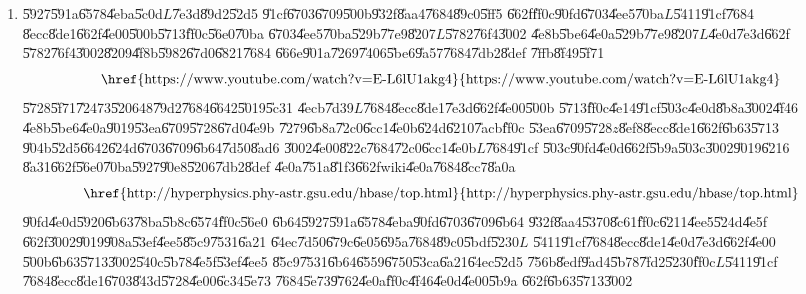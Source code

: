 \begin{enumerate}
\item \U{5927}\U{591a}\U{6578}\U{4eba}\U{5c0d}$L$\U{7e3d}\U{89d2}\U{52d5}%
\U{91cf}\U{6703}\U{6709}\U{500b}\U{932f}\U{8aa4}\U{7684}\U{89c0}\U{5ff5}%
\U{662f}\U{ff0c}\U{90fd}\U{6703}\U{4ee5}\U{70ba}$L$\U{5411}\U{91cf}\U{7684}%
\U{8ecc}\U{8de1}\U{662f}\U{4e00}\U{500b}\U{5713}\U{ff0c}\U{56e0}\U{70ba}%
\U{6703}\U{4ee5}\U{70ba}\U{529b}\U{77e9}\U{8207}$L$\U{5782}\U{76f4}\U{3002}%
\U{4e8b}\U{5be6}\U{4e0a}\U{529b}\U{77e9}\U{8207}$L$\U{4e0d}\U{7e3d}\U{662f}%
\U{5782}\U{76f4}\U{3002}\U{8209}\U{4f8b}\U{5982}\U{67d0}\U{6821}\U{7684}%
\U{666e}\U{901a}\U{7269}\U{7406}\U{5be6}\U{9a57}\U{7684}\U{7db2}\U{8def}%
\U{7ffb}\U{8f49}\U{5f71}%
\begin{equation*}
\text{\href{https://www.youtube.com/watch?v=E-L6lU1akg4}{%
https://www.youtube.com/watch?v=E-L6lU1akg4}}
\end{equation*}%
\U{5728}\U{5f71}\U{7247}3\U{5206}48\U{79d2}\U{7684}\U{6642}\U{5019}\U{5c31}%
\U{4ecb}\U{7d39}$L$\U{7684}\U{8ecc}\U{8de1}\U{7e3d}\U{662f}\U{4e00}\U{500b}%
\U{5713}\U{ff0c}\U{4e14}\U{91cf}\U{503c}\U{4e0d}\U{8b8a}\U{3002}\U{4f46}%
\U{4e8b}\U{5be6}\U{4e0a}\U{9019}\U{53ea}\U{6709}\U{5728}\U{67d0}\U{4e9b}%
\U{7279}\U{6b8a}\U{72c0}\U{6cc1}\U{4e0b}\U{624d}\U{6210}\U{7acb}\U{ff0c}%
\U{53ea}\U{6709}\U{5728}$z$\U{8ef8}\U{8ecc}\U{8de1}\U{662f}\U{6b63}\U{5713}%
\U{904b}\U{52d5}\U{6642}\U{624d}\U{6703}\U{6709}\U{6b64}\U{7d50}\U{8ad6}%
\U{3002}\U{4e00}\U{822c}\U{7684}\U{72c0}\U{6cc1}\U{4e0b}$L$\U{7684}\U{91cf}%
\U{503c}\U{90fd}\U{4e0d}\U{662f}\U{5b9a}\U{503c}\U{3002}\U{9019}\U{6216}%
\U{8a31}\U{662f}\U{56e0}\U{70ba}\U{5927}\U{90e8}\U{5206}\U{7db2}\U{8def}%
\U{4e0a}\U{751a}\U{81f3}\U{662f}wiki\U{4e0a}\U{7684}\U{8cc7}\U{8a0a}%
\begin{equation*}
\text{\href{http://hyperphysics.phy-astr.gsu.edu/hbase/top.html}{%
http://hyperphysics.phy-astr.gsu.edu/hbase/top.html}}
\end{equation*}%
\U{90fd}\U{4e0d}\U{5920}\U{6b63}\U{78ba}\U{5b8c}\U{6574}\U{ff0c}\U{56e0}%
\U{6b64}\U{5927}\U{591a}\U{6578}\U{4eba}\U{90fd}\U{6703}\U{6709}\U{6b64}%
\U{932f}\U{8aa4}\U{5370}\U{8c61}\U{ff0c}\U{6211}\U{4ee5}\U{524d}\U{4e5f}%
\U{662f}\U{3002}\U{9019}\U{908a}\U{53ef}\U{4ee5}\U{85c9}\U{7531}\U{6a21}%
\U{64ec}\U{7d50}\U{679c}\U{6e05}\U{695a}\U{7684}\U{89c0}\U{5bdf}\U{5230}$L$%
\U{5411}\U{91cf}\U{7684}\U{8ecc}\U{8de1}\U{4e0d}\U{7e3d}\U{662f}\U{4e00}%
\U{500b}\U{6b63}\U{5713}\U{3002}\U{540c}\U{5b78}\U{4e5f}\U{53ef}\U{4ee5}%
\U{85c9}\U{7531}\U{6b64}\U{6559}\U{6750}\U{53ca}\U{6a21}\U{64ec}\U{52d5}%
\U{756b}\U{8edf}\U{9ad4}\U{5b78}\U{7fd2}\U{5230}\U{ff0c}$L$\U{5411}\U{91cf}%
\U{7684}\U{8ecc}\U{8de1}\U{6703}\U{843d}\U{5728}\U{4e00}\U{6c34}\U{5e73}%
\U{7684}\U{5e73}\U{9762}\U{4e0a}\U{ff0c}\U{4f46}\U{4e0d}\U{4e00}\U{5b9a}%
\U{662f}\U{6b63}\U{5713}\U{3002}


\end{enumerate}
